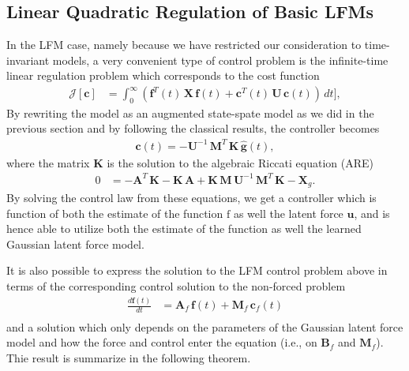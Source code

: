 \documentclass[journal]{IEEEtran}
\begin{document}
\subsection{Linear Quadratic Regulation of Basic LFMs}
%
In the LFM case, namely because we have restricted our consideration to time-invariant models, a very convenient type of control problem is the infinite-time linear regulation problem which corresponds to the cost function
%
\begin{equation}
\begin{split}
  \mathcal{J}[\mathbf{c}] &= \int_0^\infty
   (\mathbf{f}^T(t) \, \mathbf{X} \, \mathbf{f}(t)
  + \mathbf{c}^T(t) \, \mathbf{U} \, \mathbf{c}(t)) \, dt \Big],
\end{split}
\end{equation}
%
By rewriting the model as an augmented state-spate model as we did in the previous section and by following the classical results, the controller becomes
%
\begin{equation}
\begin{split}
  \mathbf{c}(t) = - \mathbf{U}^{-1} \, \mathbf{M}^T \, \mathbf{K}\, \hat{\mathbf{g}}(t),
\end{split}
\label{eq:joint_control}
\end{equation}
%
where the matrix $\mathbf{K}$ is the solution to the algebraic Riccati equation (ARE) 
%
\begin{equation}
\begin{split}
  0 &=
    -\mathbf{A}^T \, \mathbf{K} - \mathbf{K} \, \mathbf{A} 
  +  \mathbf{K} \, \mathbf{M} \, \mathbf{U}^{-1} \,
   \mathbf{M}^T \, \mathbf{K} - \mathbf{X}_g.
\end{split}
\label{eq:joint_are}
\end{equation}
%
By solving the control law from these equations, we get a controller which is function of both the estimate of the function $\mathrm{f}$ as well the latent force $\mathbf{u}$, and is hence able to utilize both the estimate of the function as well the learned Gaussian latent force model.

It is also possible to express the solution to the LFM control problem above in terms of the corresponding control solution to the non-forced problem
%
\begin{equation}
\begin{split}
  \frac{d\mathbf{f}(t)}{dt}
  &= \mathbf{A}_f \, \mathbf{f}(t) + \mathbf{M}_f \, \mathbf{c}_f(t) \\
\end{split}
\label{eq:classic_lq_model}
\end{equation}
%
and a solution which only depends on the parameters of the Gaussian latent force model and how the force and control enter the equation (i.e., on $\mathbf{B}_f$ and $\mathbf{M}_f$). Thie result is summarize in the following theorem.
\end{document}
